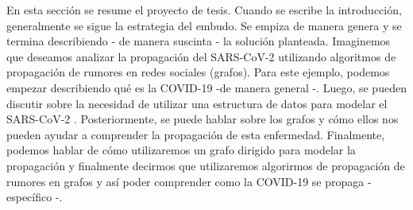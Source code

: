 En esta sección se resume el proyecto de tesis. Cuando se escribe la introducción, generalmente se sigue la estrategia del embudo. Se empiza de manera genera y se termina describiendo - de manera suscinta - la solución planteada. Imaginemos que deseamos analizar la propagación del SARS-CoV-2 utilizando algoritmos de propagación de rumores en redes sociales (grafos). Para este ejemplo, podemos empezar describiendo qué es la COVID-19 -de manera general -. Luego, se pueden discutir sobre la necesidad de utilizar una estructura de datos para modelar el SARS-CoV-2 . Posteriormente, se puede hablar sobre los grafos y cómo ellos nos pueden ayudar a comprender la propagación de esta enfermedad. Finalmente, podemos hablar de cómo utilizaremos un grafo dirigido para modelar la propagación y finalmente decirmos que utilizaremos algorirmos de propagación de rumores en grafos y así  poder comprender como la COVID-19 se propaga - específico -.